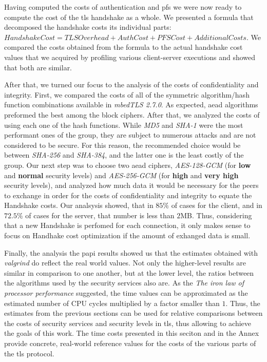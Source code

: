 Having computed the costs of authentication and \gls{pfs} we were now ready to compute the cost of the \gls{tls} handshake
as a whole. We presented a formula that decomposed the handshake costs its individual parts: $Handshake Cost = TLS Overhead + Auth Cost + PFS Cost + Additional Costs$. 
We compared the costs
obtained from the formula to the actual handshake cost values that we acquired by profiling various client-server
executions and showed that both are similar.

After that, we turned our focus to the analysis of the costs of confidentiality and integrity. First, we compared the costs of all of the
symmetric algorithm/hash function combinations available in \textit{mbedTLS 2.7.0}. As expected,
\gls{aead} algorithms preformed the best among the block ciphers. After that, we analyzed the costs of using each one of the
hash functions. While \textit{MD5} and \textit{SHA-1} were the most performant ones of the group, they are subject to numerous attacks and are not considered
to be secure.  For this reason, the recommended choice would be between \textit{SHA-256} and \textit{SHA-384}, and the latter one is the
least costly of the group. Our next step was to choose two \gls{aead} ciphers, \textit{AES-128-GCM} (for \textbf{low} and 
\textbf{normal} security levels) and \textit{AES-256-GCM} (for \textbf{high} and \textbf{very high} security levels), and
analyzed how much data it would be necessary for the peers to exchange in order for the costs of confidentiality and integrity 
to equate the Handshake costs. Our analsysis showed, that in $85\%$ of cases for the client, and in $72.5\%$ of cases for the server, 
that number is less than $2$MB. Thus, considering that a new Handshake is perfomed for each connection, 
it only makes sense to focus on Handhake cost optimization if the amount of exhanged data is small.

Finally, the analysis the \gls{papi} results showed us that the estimates obtained with \textit{valgrind} do reflect the real world values. 
Not only the higher-level results are similar in comparison to one another, but at the lower level, the ratios between the algorithms 
used by the security services also are. As the \textit{The iron law of processor performance} suggested, the time values can be approximated as 
the estimated number of CPU cycles multiplied by a factor smaller than $1$. Thus, the estimates from the previous sections can be used for 
relative comparisons between the costs of security services and security levels in \gls{tls}, thus allowing to achieve the goals of this work. 
The time costs presented in this seciton and in the Annex provide concrete, real-world reference values for the costs of the various parts of 
the \gls{tls} protocol.